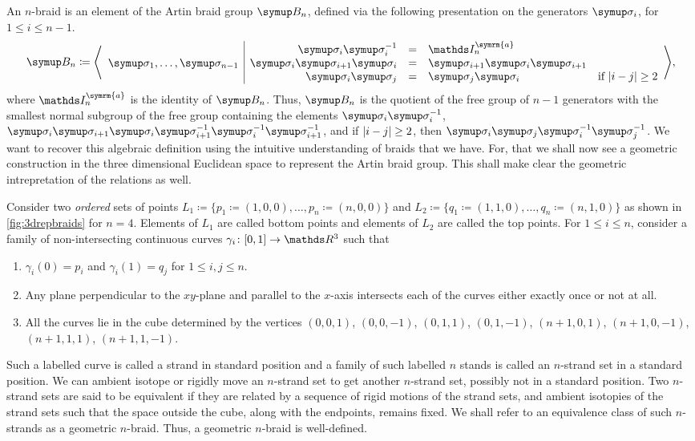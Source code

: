 An \(n\)-braid is an element of the Artin braid group \(\B_n\), defined via the following presentation on the generators \(\sigmaa_i\), for \(1 \leq i \leq n-1 \).
\[\B_n \coloneq\Biggl\langle
\begin{array}{c|rcll}
	& \sigmaa_i \sigmaa_i^{-1} &=& \symbb{I}_n^{\symrm{a}} &\\
	\sigmaa_1, \ldots, \sigmaa_{n-1} & \sigmaa_i \sigmaa_{i+1} \sigmaa_i &=& \sigmaa_{i+1} \sigmaa_i \sigmaa_{i+1} &\\
	& \sigmaa_i \sigmaa_j &=& \sigmaa_j \sigmaa_i &\text{if } \abs{i-j} \geq 2
\end{array}
\Biggr\rangle,\] where \(\symbb{I}_n^{\symrm{a}}\) is the identity of \(\B_n\).
Thus, \(\B_n\) is the quotient of the free group of \(n-1\) generators with the smallest normal subgroup of the free group containing the elements \(\sigmaa_i \sigmaa_i^{-1}\), \(\sigmaa_i \sigmaa_{i+1} \sigmaa_i \sigmaa_{i+1}^{-1} \sigmaa_i^{-1} \sigmaa_{i+1}^{-1}\), and if \(\lvert i-j\rvert \geq 2\), then \(\sigmaa_i \sigmaa_j \sigmaa_i^{-1} \sigmaa_{j}^{-1}\). We want to recover this algebraic definition using the intuitive understanding of braids that we have. For, that we shall now see a geometric construction in the three dimensional Euclidean space to represent the Artin braid group. This shall make clear the geometric intrepretation of the relations as well.

Consider two \textit{ordered} sets of points \(L_1 \coloneq \{p_1 \coloneq (1,0,0), \ldots, p_n \coloneq (n,0,0)\}\) and \(L_2 \coloneq \{q_1 \coloneq (1,1,0), \ldots, q_n \coloneq (n,1,0)\}\) as shown in \cref{fig:3drepbraids} for \(n=4\). Elements of \(L_1\) are called bottom points and elements of \(L_2\) are called the top points. For \(1 \leq i \leq n\), consider a family of non-intersecting continuous curves \(\gamma_i \colon [0, 1] \rightarrow \rthree\) such that
\begin{enumerate}
	\item \(\gamma_i (0) = p_i\) and \(\gamma_i (1) = q_j\) for \(1 \leq i, j \leq n\).
	\item Any plane perpendicular to the \(xy\)-plane and parallel to the \(x\)-axis intersects each of the curves either exactly once or not at all.
	\item All the curves lie in the cube determined by the vertices \((0,0,1)\), \((0,0,-1)\), \((0,1,1)\), \((0,1,-1)\), \((n+1,0,1)\), \((n+1,0,-1)\), \((n+1,1,1)\), \((n+1,1,-1)\).
\end{enumerate}
Such a labelled curve is called a strand in standard position and a family of such labelled \(n\) stands is called an \(n\)-strand set in a standard position. We can ambient isotope or rigidly move an \(n\)-strand set to get another \(n\)-strand set, possibly not in a standard position. Two \(n\)-strand sets are said to be equivalent if they are related by a sequence of rigid motions of the strand sets, and ambient isotopies of the strand sets such that the space outside the cube, along with the endpoints, remains fixed. We shall refer to an equivalence class of such \(n\)-strands as a geometric \(n\)-braid. Thus, a geometric \(n\)-braid is well-defined.

